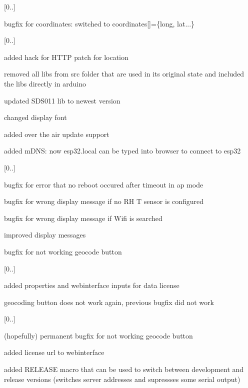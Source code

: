 \begin{DoxyItemize}
\item \mbox{[}0..\mbox{]}
\begin{DoxyItemize}
\item bugfix for coordinates\+: switched to coordinates\mbox{[}\mbox{]}=\{long, lat...\}
\end{DoxyItemize}
\item \mbox{[}0..\mbox{]}
\begin{DoxyItemize}
\item added hack for H\+T\+TP patch for location
\item removed all libs from src folder that are used in its original state and included the libs directly in arduino
\item updated S\+D\+S011 lib to newest version
\item changed display font
\item added over the air update support
\item added m\+D\+NS\+: now esp32.\+local can be typed into browser to connect to esp32
\end{DoxyItemize}
\item \mbox{[}0..\mbox{]}
\begin{DoxyItemize}
\item bugfix for error that no reboot occured after timeout in ap mode
\item bugfix for wrong display message if no RH T sensor is configured
\item bugfix for wrong display message if Wifi is searched
\item improved display messages
\item bugfix for not working geocode button
\end{DoxyItemize}
\item \mbox{[}0..\mbox{]}
\begin{DoxyItemize}
\item added properties and webinterface inputs for data license
\item geocoding button does not work again, previous bugfix did not work
\end{DoxyItemize}
\item \mbox{[}0..\mbox{]}
\begin{DoxyItemize}
\item (hopefully) permanent bugfix for not working geocode button
\item added license url to webinterface
\item added R\+E\+L\+E\+A\+SE macro that can be used to switch between development and release versions (switches server addresses and supressses some serial output)

\end{DoxyItemize}
\end{DoxyItemize}
